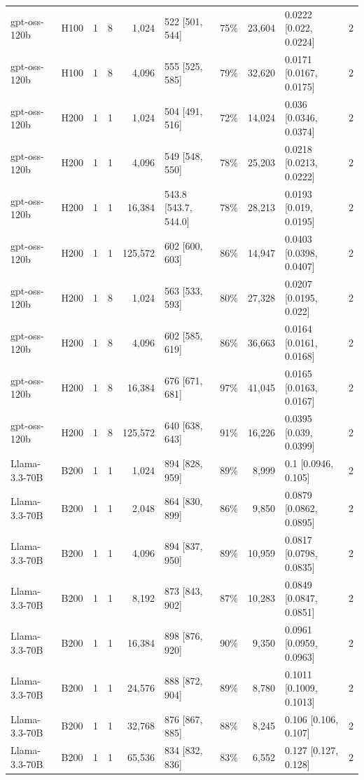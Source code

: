 \begin{landscape}
\begin{longtable}{llrrrlrrlr}
gpt-oss-120b & H100 & 1 & 8 & 1,024 & 522 {[}501, 544{]} & 75\% & 23,604 & 0.0222 {[}0.022, 0.0224{]} & 2 \\
gpt-oss-120b & H100 & 1 & 8 & 4,096 & 555 {[}525, 585{]} & 79\% & 32,620 & 0.0171 {[}0.0167, 0.0175{]} & 2 \\
gpt-oss-120b & H200 & 1 & 1 & 1,024 & 504 {[}491, 516{]} & 72\% & 14,024 & 0.036 {[}0.0346, 0.0374{]} & 2 \\
gpt-oss-120b & H200 & 1 & 1 & 4,096 & 549 {[}548, 550{]} & 78\% & 25,203 & 0.0218 {[}0.0213, 0.0222{]} & 2 \\
gpt-oss-120b & H200 & 1 & 1 & 16,384 & 543.8 {[}543.7, 544.0{]} & 78\% & 28,213 & 0.0193 {[}0.019, 0.0195{]} & 2 \\
gpt-oss-120b & H200 & 1 & 1 & 125,572 & 602 {[}600, 603{]} & 86\% & 14,947 & 0.0403 {[}0.0398, 0.0407{]} & 2 \\
gpt-oss-120b & H200 & 1 & 8 & 1,024 & 563 {[}533, 593{]} & 80\% & 27,328 & 0.0207 {[}0.0195, 0.022{]} & 2 \\
gpt-oss-120b & H200 & 1 & 8 & 4,096 & 602 {[}585, 619{]} & 86\% & 36,663 & 0.0164 {[}0.0161, 0.0168{]} & 2 \\
gpt-oss-120b & H200 & 1 & 8 & 16,384 & 676 {[}671, 681{]} & 97\% & 41,045 & 0.0165 {[}0.0163, 0.0167{]} & 2 \\
gpt-oss-120b & H200 & 1 & 8 & 125,572 & 640 {[}638, 643{]} & 91\% & 16,226 & 0.0395 {[}0.039, 0.0399{]} & 2 \\
Llama-3.3-70B & B200 & 1 & 1 & 1,024 & 894 {[}828, 959{]} & 89\% & 8,999 & 0.1 {[}0.0946, 0.105{]} & 2 \\
Llama-3.3-70B & B200 & 1 & 1 & 2,048 & 864 {[}830, 899{]} & 86\% & 9,850 & 0.0879 {[}0.0862, 0.0895{]} & 2 \\
Llama-3.3-70B & B200 & 1 & 1 & 4,096 & 894 {[}837, 950{]} & 89\% & 10,959 & 0.0817 {[}0.0798, 0.0835{]} & 2 \\
Llama-3.3-70B & B200 & 1 & 1 & 8,192 & 873 {[}843, 902{]} & 87\% & 10,283 & 0.0849 {[}0.0847, 0.0851{]} & 2 \\
Llama-3.3-70B & B200 & 1 & 1 & 16,384 & 898 {[}876, 920{]} & 90\% & 9,350 & 0.0961 {[}0.0959, 0.0963{]} & 2 \\
Llama-3.3-70B & B200 & 1 & 1 & 24,576 & 888 {[}872, 904{]} & 89\% & 8,780 & 0.1011 {[}0.1009, 0.1013{]} & 2 \\
Llama-3.3-70B & B200 & 1 & 1 & 32,768 & 876 {[}867, 885{]} & 88\% & 8,245 & 0.106 {[}0.106, 0.107{]} & 2 \\
Llama-3.3-70B & B200 & 1 & 1 & 65,536 & 834 {[}832, 836{]} & 83\% & 6,552 & 0.127 {[}0.127, 0.128{]} & 2 \\

\end{longtable}
\end{landscape}

